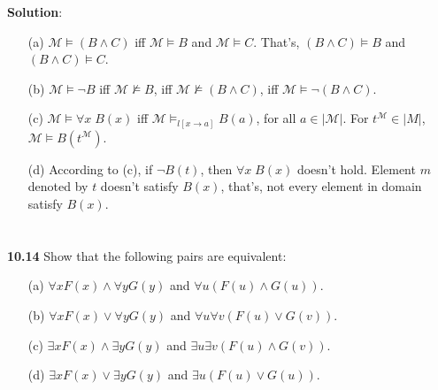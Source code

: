 \documentclass{ctexart}
\begin{document}
\textbf{Solution}:
\begin{itemize}

\item[(a)] $\mathcal M \vDash (B \land C)$ iff $\mathcal M \vDash B$ and $\mathcal M \vDash C$. That's,
$(B \land C) \vDash B$ and $(B \land C) \vDash C$.

\item[(b)] $\mathcal M \vDash \lnot B$ iff $\mathcal M \not\vDash B$,
iff $\mathcal M \not\vDash (B \land C)$,
iff $\mathcal M \vDash \lnot (B \land C)$.

\item[(c)]
$\mathcal M \vDash \forall x\; B(x)$ iff $\mathcal M \vDash_{l[x \to a]} B(a)$, for all $a \in |\mathcal M|$.
For $t^{\mathcal M} \in |M|$, $\mathcal M \vDash B(t^{\mathcal M})$.

\item[(d)] According to (c), if $\lnot B(t)$, then $\forall x\; B(x)$ doesn't hold.
Element $m$ denoted by $t$ doesn't satisfy $B(x)$, that's, not every element in domain satisfy $B(x)$.

\end{itemize}

\section*{}
\textbf{10.14}
Show that the following pairs are equivalent:
\begin{itemize}
\item [(a)] $\forall x F(x) \land \forall y G(y)$ and $\forall u(F(u) \land G(u))$.
\item [(b)] $\forall x F(x) \lor \forall y G(y)$ and $\forall u\forall v(F(u) \lor G(v))$.
\item [(c)] $\exists x F(x) \land \exists y G(y)$ and $\exists u\exists v(F(u) \land G(v))$.
\item [(d)] $\exists x F(x) \lor \exists y G(y)$ and $\exists u(F(u) \lor G(u))$.
\end{itemize}
\end{document}
